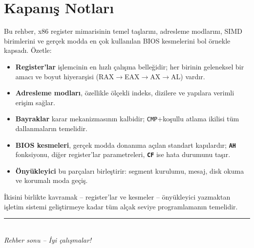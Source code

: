 \documentclass[11pt,a4paper]{article}
\newcommand{\reg}[1]{\texttt{\color{anaMavi}\textbf{#1}}}
\newcommand{\kod}[1]{\texttt{\color{koyuGri}#1}}
\begin{document}
\section{Kapanış Notları}

Bu rehber, x86 register mimarisinin temel taşlarını, adresleme modlarını, SIMD
birimlerini ve gerçek modda en çok kullanılan BIOS kesmelerini bol örnekle
kapsadı. Özetle:

\begin{itemize}[leftmargin=1.4em]
  \item \textbf{Register'lar} işlemcinin en hızlı çalışma belleğidir; her birinin
        geleneksel bir amacı ve boyut hiyerarşisi (RAX$\to$EAX$\to$AX$\to$AL) vardır.
  \item \textbf{Adresleme modları}, özellikle ölçekli indeks, dizilere ve
        yapılara verimli erişim sağlar.
  \item \textbf{Bayraklar} karar mekanizmasının kalbidir; \kod{CMP}+koşullu
        atlama ikilisi tüm dallanmaların temelidir.
  \item \textbf{BIOS kesmeleri}, gerçek modda donanıma açılan standart kapılardır;
        \reg{AH} fonksiyonu, diğer register'lar parametreleri, \reg{CF} ise
        hata durumunu taşır.
  \item \textbf{Önyükleyici} bu parçaları birleştirir: segment kurulumu, mesaj,
        disk okuma ve korumalı moda geçiş.
\end{itemize}

İkisini birlikte kavramak -- register'lar ve kesmeler -- önyükleyici yazmaktan
işletim sistemi geliştirmeye kadar tüm alçak seviye programlamanın temelidir.

\vspace{0.8cm}
\begin{center}
{\color{turuncu}\rule{0.5\textwidth}{1.5pt}}\\[6pt]
{\color{ortaGri}\textit{Rehber sonu -- İyi çalışmalar!}}
\end{center}
\end{document}
